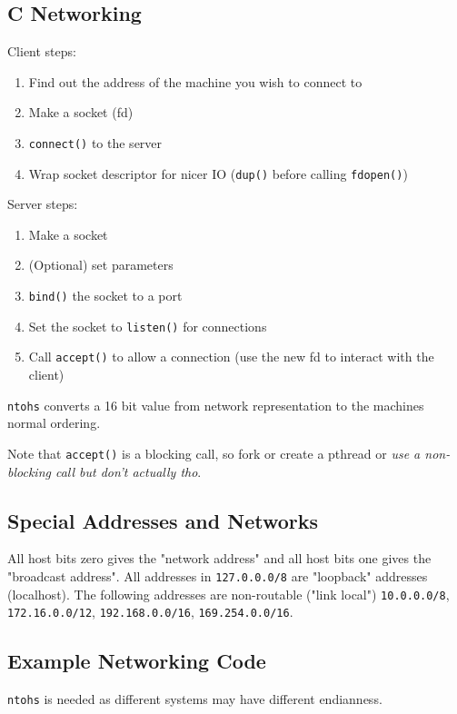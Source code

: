 \documentclass[a4]{article}
\begin{document}
\begin{multicols*}{3}
		\subsection{C Networking}
		\label{sub:c_networking}
		
		
			Client steps:
			\begin{enumerate}
			    \item Find out the address of the machine you wish to connect to
			    \item Make a socket (fd)
			    \item \texttt{connect()} to the server
			    \item Wrap socket descriptor for nicer IO (\texttt{dup()} before calling \texttt{fdopen()})
			\end{enumerate}
			
			Server steps:
			\begin{enumerate}
			    \item Make a socket
			    \item (Optional) set parameters
			    \item \texttt{bind()} the socket to a port
			    \item Set the socket to \texttt{listen()} for connections
			    \item Call \texttt{accept()} to allow a connection (use the new fd to interact with the client)
			\end{enumerate}
			
			\texttt{ntohs} converts a 16 bit value from network representation to the machines normal ordering.
			
			Note that \texttt{accept()} is a blocking call, so fork or create a pthread or \textit{use a non-blocking call but don't actually tho}.

		\subsection{Special Addresses and Networks}
		\label{sub:special_addresses}
		
		All host bits zero gives the "network address" and all host bits one gives the "broadcast address". All addresses in \texttt{127.0.0.0/8} are "loopback" addresses (localhost). The following addresses are non-routable ("link local") \texttt{10.0.0.0/8}, \texttt{172.16.0.0/12}, \texttt{192.168.0.0/16}, \texttt{169.254.0.0/16}. 
			
		
		\subsection{Example Networking Code}
		\label{sub:example_networking_code}
			\texttt{ntohs} is needed as different systems may have different endianness.


\end{multicols*}
\end{document}
